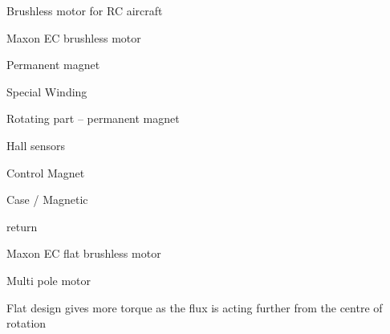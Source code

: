 \documentclass[compress]{beamer}
\begin{document}
\begin{frame}{Brushless motor for RC aircraft}

\end{frame}

\begin{frame}{Maxon EC brushless motor}

Permanent magnet

Special Winding

Rotating part -- permanent magnet

Hall sensors

Control Magnet

Case / Magnetic

return

\end{frame}

\begin{frame}{Maxon EC flat brushless motor}

Multi pole motor

Flat design gives more torque as the flux is acting further from the
centre of rotation

\end{frame}
\end{document}
